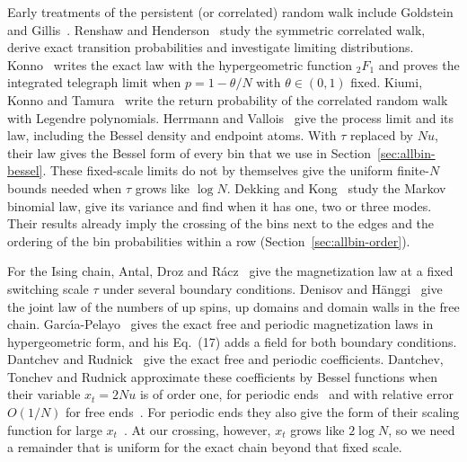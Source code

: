 \documentclass[11pt]{article}
\theoremstyle{definition}
\theoremstyle{remark}
\begin{document}
Early treatments of the persistent (or correlated) random walk include Goldstein~\cite{goldstein1951}
and Gillis~\cite{gillis1955}. Renshaw and Henderson~\cite{renshaw1981} study the
symmetric correlated walk, derive exact transition probabilities and
investigate limiting distributions. Konno~\cite[Lemma~2 and Theorem~7]{konno2009}
writes the exact law with the hypergeometric function ${}_2F_1$ and proves the
integrated telegraph limit when $p=1-\theta/N$ with $\theta\in(0,1)$ fixed.
Kiumi, Konno and Tamura~\cite[Proposition~3]{kiumi2022} write the return
probability of the correlated random walk with Legendre polynomials.
Herrmann and Vallois~\cite[Theorem~2.1 and Remark~3.4]{herrmann2010}
give the process limit and its law, including the Bessel density and endpoint
atoms. With $\tau$ replaced by $Nu$, their law gives the Bessel form of every
bin that we use in Section~\ref{sec:allbin-bessel}. These fixed-scale limits
do not by themselves give the uniform finite-$N$ bounds needed when $\tau$
grows like $\log N$. Dekking and Kong~\cite{dekkingkong2011} study the Markov
binomial law, give its variance and find when it has one, two or three modes.
Their results already imply the crossing of the bins next to the edges and the
ordering of the bin probabilities within a row (Section~\ref{sec:allbin-order}).

For the Ising chain, Antal, Droz and R\'acz~\cite{antal2004} give the
magnetization law at a fixed switching scale $\tau$ under several
boundary conditions. Denisov and H\"anggi~\cite[Eq.~(3.6)]{denisov2005}
give the joint law of the numbers of up spins, up domains and domain walls
in the free chain. Garc\'{\i}a-Pelayo~\cite[Eqs.~(14) and (15)]{garciapelayo2009}
gives the exact free and periodic magnetization laws in hypergeometric
form, and his Eq.~(17) adds a field for both boundary conditions.
Dantchev and Rudnick~\cite{dantchev2022} give the
exact free and periodic coefficients. Dantchev, Tonchev and Rudnick
approximate these coefficients by Bessel functions when their variable
$x_t=2Nu$ is of order one, for periodic
ends~\cite[Section~4.3.1 and Appendix~D]{dantchev2023} and with relative
error $O(1/N)$ for free
ends~\cite[Section~3, Eq.~(3.10)]{dantchev2024}. For periodic ends they
also give the form of their scaling function for large
$x_t$~\cite[Eq.~(4.14)]{dantchev2023}. At our crossing,
however, $x_t$ grows like $2\log N$, so we need a remainder that is
uniform for the exact chain beyond that fixed scale.
\end{document}
